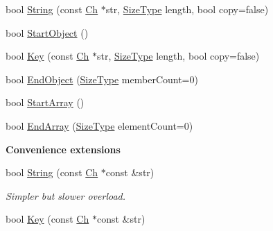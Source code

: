 \begin{Indent}
\begin{DoxyCompactItemize}
\item 
bool \mbox{\hyperlink{classrapidjson_1_1_writer_a3cddcb5176054f559d0d552a3ff8789b}{String}} (const \mbox{\hyperlink{classrapidjson_1_1_writer_a2cf973937ca1110293bf1350fac2a6d6}{Ch}} $\ast$str, \mbox{\hyperlink{namespacerapidjson_a44eb33eaa523e36d466b1ced64b85c84}{Size\+Type}} length, bool copy=false)
\item 
bool \mbox{\hyperlink{classrapidjson_1_1_writer_a8b0be54744be8ecb53cbe7e408447faa}{Start\+Object}} ()
\item 
bool \mbox{\hyperlink{classrapidjson_1_1_writer_a58ecbfbe9f86e5303448f2b8024cbd46}{Key}} (const \mbox{\hyperlink{classrapidjson_1_1_writer_a2cf973937ca1110293bf1350fac2a6d6}{Ch}} $\ast$str, \mbox{\hyperlink{namespacerapidjson_a44eb33eaa523e36d466b1ced64b85c84}{Size\+Type}} length, bool copy=false)
\item 
bool \mbox{\hyperlink{classrapidjson_1_1_writer_ac8851882467c9c00cd8c2a202261e2b0}{End\+Object}} (\mbox{\hyperlink{namespacerapidjson_a44eb33eaa523e36d466b1ced64b85c84}{Size\+Type}} member\+Count=0)
\item 
bool \mbox{\hyperlink{classrapidjson_1_1_writer_a7019d2c81548f7b4dcc96f98a3e2bf76}{Start\+Array}} ()
\item 
bool \mbox{\hyperlink{classrapidjson_1_1_writer_a13c98a10c8a8be0823c6cfd8e1b479a4}{End\+Array}} (\mbox{\hyperlink{namespacerapidjson_a44eb33eaa523e36d466b1ced64b85c84}{Size\+Type}} element\+Count=0)
\end{DoxyCompactItemize}
\end{Indent}
\begin{Indent}\textbf{ Convenience extensions}\par
\begin{DoxyCompactItemize}
\item 
bool \mbox{\hyperlink{classrapidjson_1_1_writer_a849e2b675a2b868699a14d45c7396f24}{String}} (const \mbox{\hyperlink{classrapidjson_1_1_writer_a2cf973937ca1110293bf1350fac2a6d6}{Ch}} $\ast$const \&str)
\begin{DoxyCompactList}\small\item\em Simpler but slower overload. \end{DoxyCompactList}\item 
bool \mbox{\hyperlink{classrapidjson_1_1_writer_adb7804b54bcd5e71c69ec219652787d5}{Key}} (const \mbox{\hyperlink{classrapidjson_1_1_writer_a2cf973937ca1110293bf1350fac2a6d6}{Ch}} $\ast$const \&str)
\end{DoxyCompactItemize}
\end{Indent}
